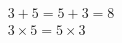 \documentclass[nofonts]{ctexart}
\begin{document}
\begin{gather*}
	3 + 5 = 5 + 3 = 8		\\
	3 \times 5 = 5 \times 3
\end{gather*}
\end{document}
